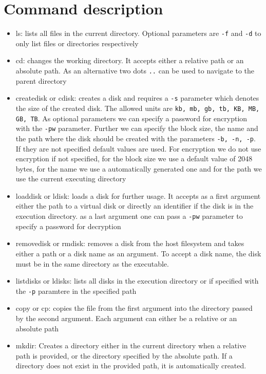\documentclass{report}
\begin{document}
\section{Command description}
\begin{itemize}
\item ls: lists all files in the current directory. Optional parameters are \texttt{-f} and \texttt{-d} to only list files or directories respectively
\item cd: changes the working directory. It accepts either a relative path or an absolute path. As an alternative two dots \texttt{..} can be used to navigate to the parent directory
\item createdisk or cdisk: creates a disk and requires a \texttt{-s} parameter which denotes the size of the created disk. The allowed units are \texttt{kb, mb, gb, tb, KB, MB, GB, TB}. As optional parameters we can specify a password for encryption with the \texttt{-pw} parameter. Further we can specify the block size, the name and the path where the disk should be created with the parameters \texttt{-b, -n, -p}. If they are not specified default values are used. For encryption we do not use encryption if not specified, for the block size we use a default value of 2048 bytes, for the name we use a automatically generated one and for the path we use the current executing directory
\item loaddisk or ldisk: loads a disk for further usage. It accepts as a first argument either the path to a virtual disk or directly an identifier if the disk is in the execution directory. as a last argument one can pass a \texttt{-pw} parameter to specify a password for decryption
\item removedisk or rmdisk: removes a disk from the host filesystem and takes either a path or a disk name as an argument. To accept a disk name, the disk must be in the same directory as the executable.
\item listdisks or ldisks: lists all disks in the execution directory or if specified with the \texttt{-p} paramtere in the specified path
\item copy or cp: copies the file from the first argument into the directory passed by the second argument. Each argument can either be a relative or an absolute path
\item mkdir: Creates a directory either in the current directory when a relative path is provided, or the directory specified by the absolute path. If a directory does not exist in the provided path, it is automatically created.

\end{itemize}
\end{document}
